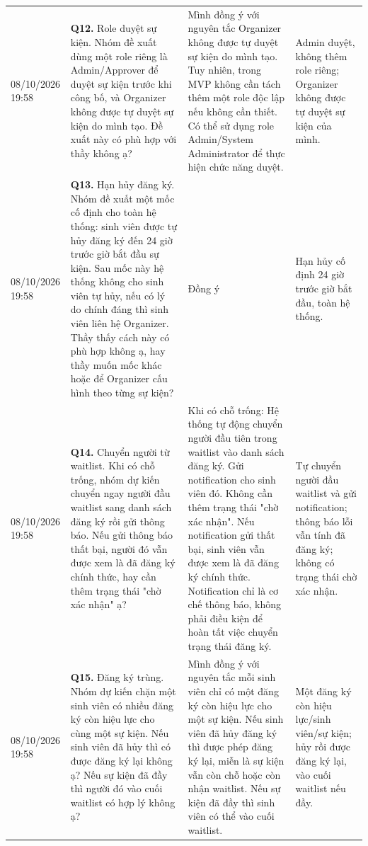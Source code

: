 \begin{landscape}
\begin{longtable}{L{2.08cm}L{7.22cm}L{6.32cm}L{4.70cm}}
08/10/2026 19:58 & \textbf{Q12.} Role duyệt sự kiện. Nhóm đề xuất dùng một role riêng là Admin/Approver để duyệt sự kiện trước khi công bố, và Organizer không được tự duyệt sự kiện do mình tạo. Đề xuất này có phù hợp với thầy không ạ? & Mình đồng ý với nguyên tắc Organizer không được tự duyệt sự kiện do mình tạo. Tuy nhiên, trong MVP không cần tách thêm một role độc lập nếu không cần thiết. Có thể sử dụng role Admin/System Administrator để thực hiện chức năng duyệt. & Admin duyệt, không thêm role riêng; Organizer không được tự duyệt sự kiện của mình. \\
08/10/2026 19:58 & \textbf{Q13.} Hạn hủy đăng ký. Nhóm đề xuất một mốc cố định cho toàn hệ thống: sinh viên được tự hủy đăng ký đến 24 giờ trước giờ bắt đầu sự kiện. Sau mốc này hệ thống không cho sinh viên tự hủy, nếu có lý do chính đáng thì sinh viên liên hệ Organizer. Thầy thấy cách này có phù hợp không ạ, hay thầy muốn mốc khác hoặc để Organizer cấu hình theo từng sự kiện? & Đồng ý & Hạn hủy cố định 24 giờ trước giờ bắt đầu, toàn hệ thống. \\
08/10/2026 19:58 & \textbf{Q14.} Chuyển người từ waitlist. Khi có chỗ trống, nhóm dự kiến chuyển ngay người đầu waitlist sang danh sách đăng ký rồi gửi thông báo. Nếu gửi thông báo thất bại, người đó vẫn được xem là đã đăng ký chính thức, hay cần thêm trạng thái "chờ xác nhận" ạ? & Khi có chỗ trống: Hệ thống tự động chuyển người đầu tiên trong waitlist vào danh sách đăng ký. Gửi notification cho sinh viên đó. Không cần thêm trạng thái "chờ xác nhận". Nếu notification gửi thất bại, sinh viên vẫn được xem là đã đăng ký chính thức. Notification chỉ là cơ chế thông báo, không phải điều kiện để hoàn tất việc chuyển trạng thái đăng ký. & Tự chuyển người đầu waitlist và gửi notification; thông báo lỗi vẫn tính đã đăng ký; không có trạng thái chờ xác nhận. \\
08/10/2026 19:58 & \textbf{Q15.} Đăng ký trùng. Nhóm dự kiến chặn một sinh viên có nhiều đăng ký còn hiệu lực cho cùng một sự kiện. Nếu sinh viên đã hủy thì có được đăng ký lại không ạ? Nếu sự kiện đã đầy thì người đó vào cuối waitlist có hợp lý không ạ? & Mình đồng ý với nguyên tắc mỗi sinh viên chỉ có một đăng ký còn hiệu lực cho một sự kiện. Nếu sinh viên đã hủy đăng ký thì được phép đăng ký lại, miễn là sự kiện vẫn còn chỗ hoặc còn nhận waitlist. Nếu sự kiện đã đầy thì sinh viên có thể vào cuối waitlist. & Một đăng ký còn hiệu lực/sinh viên/sự kiện; hủy rồi được đăng ký lại, vào cuối waitlist nếu đầy. \\

\end{longtable}
\end{landscape}

